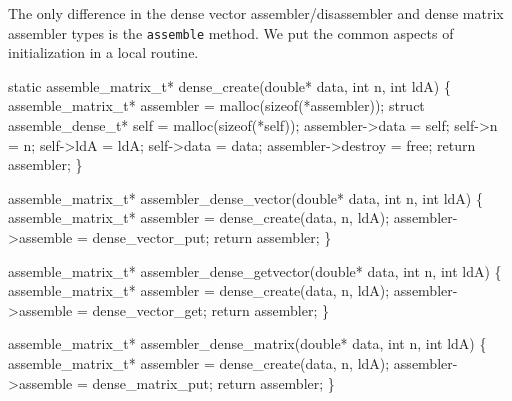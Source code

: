 \nwendcode{}\nwdocspar

The only difference in the dense vector assembler/disassembler and
dense matrix assembler types is the {\tt{}assemble} method.  We put
the common aspects of initialization in a local routine.

\nwenddocs{}\plusendmoddef
static assemble_matrix_t* dense_create(double* data, int n, int ldA)
\{
    assemble_matrix_t* assembler  = malloc(sizeof(*assembler));
    struct assemble_dense_t* self = malloc(sizeof(*self));
    assembler->data   = self;
    self->n           = n;
    self->ldA         = ldA;
    self->data        = data;
    assembler->destroy  = free; 
    return assembler;
\}

\nwendcode{}\nwdocspar

\nwenddocs{}\endmoddef
assemble_matrix_t* assembler_dense_vector(double* data, int n, int ldA)
\{
    assemble_matrix_t* assembler = dense_create(data, n, ldA);
    assembler->assemble = dense_vector_put;
    return assembler;
\}

\nwendcode{}\nwdocspar

\nwenddocs{}\plusendmoddef
assemble_matrix_t* assembler_dense_getvector(double* data, int n, int ldA)
\{
    assemble_matrix_t* assembler = dense_create(data, n, ldA);
    assembler->assemble = dense_vector_get;
    return assembler;
\}

\nwendcode{}\nwdocspar

\nwenddocs{}\plusendmoddef
assemble_matrix_t* assembler_dense_matrix(double* data, int n, int ldA)
\{
    assemble_matrix_t* assembler = dense_create(data, n, ldA);
    assembler->assemble = dense_matrix_put;
    return assembler;
\}

